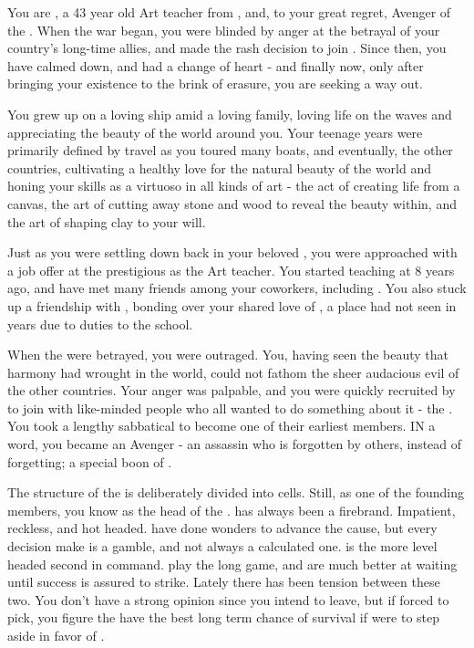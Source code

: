 \documentclass[char]{GL2020}
\begin{document}
\name{\cChupAvenger{}}


You are \cChupAvenger{}, a 43 year old Art teacher from \pShip{}, and, to your great regret, Avenger of the \pGoat{}. When the war began, you were blinded by anger at the betrayal of your country’s long-time allies, and made the rash decision to join \pGoaties{}. Since then, you have calmed down, and had a change of heart - and finally now, only after bringing your existence to the brink of erasure, you are seeking a way out.

You grew up on a loving ship amid a loving family, loving life on the waves and appreciating the beauty of the world around you. Your teenage years were primarily defined by travel as you toured many boats, and eventually, the other countries, cultivating a healthy love for the natural beauty of the world and honing your skills as a virtuoso in all kinds of art - the act of creating life from a canvas, the art of cutting away stone and wood to reveal the beauty within, and the art of shaping clay to your will. 

Just as you were settling down back in your beloved \pShip{}, you were approached with a job offer at the prestigious \pSchool{} as the Art teacher. You started teaching at \pSchool{} 8 years ago, and have met many friends among your coworkers, including \cLibrarian{}. You also stuck up a friendship with \cPrincipal{}, bonding over your shared love of \pShip{}, a place \cPrincipal{\they} had not seen in years due to \cPrincipal{\their} duties to the school.

When the \pShip{} were betrayed, you were outraged. You, having seen the beauty that harmony had wrought in the world, could not fathom the sheer audacious evil of the other countries. Your anger was palpable, and you were quickly recruited by \cChupSecond{} to join with like-minded people who all wanted to do something about it - the \pGoaties{}. You took a lengthy sabbatical to become one of their earliest members. IN a word, you became an Avenger - an assassin who is forgotten by others, instead of forgetting; a special boon of \cGenesis{}.

The structure of the \pGoaties{} is deliberately divided into cells. Still, as one of the founding members, you know \cChupLeader{} as the head of the \pGoaties{}. \cChupLeader{} has always been a firebrand. Impatient, reckless, and hot headed. \cChupLeader{\They} have done wonders to advance the \pGoaties{} cause, but every decision \cChupLeader{\they} make\cChupLeader{\plural} is a gamble, and not always a calculated one. \cChupSecond{} is the more level headed second in command. \cChupSecond{\They} play\cChupLeader{\plural} the long game, and are much better at waiting until success is assured to strike. Lately there has been tension between these two. You don’t have a strong opinion since you intend to leave, but if forced to pick, you figure the \pGoaties{} have the best long term chance of survival if \cChupLeader{} were to step aside in favor of \cChupSecond{}. 
\end{document}

